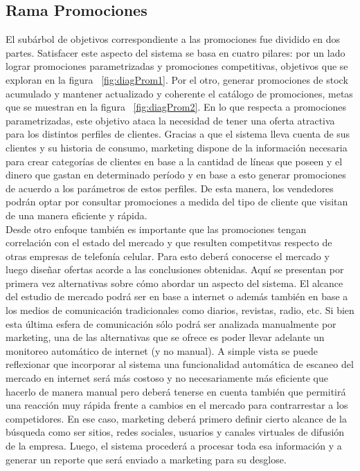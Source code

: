 \subsection{Rama Promociones}

El subárbol de objetivos correspondiente a las promociones fue dividido en dos partes. Satisfacer este aspecto del sistema se basa en cuatro pilares: por un lado lograr promociones parametrizadas y promociones competitivas, objetivos que se exploran en la figura ~\ref{fig:diagProm1}. Por el otro, generar promociones de stock acumulado y mantener actualizado y coherente el catálogo de promociones, metas que se muestran en la figura ~\ref{fig:diagProm2}. En lo que respecta a promociones parametrizadas, este objetivo ataca la necesidad de tener una oferta atractiva para los distintos perfiles de clientes. Gracias a que el sistema lleva cuenta de sus clientes y su historia de consumo, marketing dispone de la información necesaria para crear categorías de clientes en base a la cantidad de líneas que poseen y el dinero que gastan en determinado período y en base a esto generar promociones de acuerdo a los parámetros de estos perfiles. De esta manera, los vendedores podrán optar por consultar promociones a medida del tipo de cliente que visitan de una manera eficiente y rápida.\\
\indent Desde otro enfoque también es importante que las promociones tengan correlación con el estado del mercado y que resulten competitvas respecto de otras empresas de telefonía celular. Para esto deberá conocerse el mercado y luego diseñar ofertas acorde a las conclusiones obtenidas. Aquí se presentan por primera vez alternativas sobre cómo abordar un aspecto del sistema. El alcance del estudio de mercado podrá ser en base a internet o además también en base a los medios de comunicación tradicionales como diarios, revistas, radio, etc. Si bien esta última esfera de comunicación sólo podrá ser analizada manualmente por marketing, una de las alternativas que se ofrece es poder llevar adelante un monitoreo automático de internet (y no manual). A simple vista se puede reflexionar que incorporar al sistema una funcionalidad automática de escaneo del mercado en internet será más costoso y no necesariamente más eficiente que hacerlo de manera manual pero deberá tenerse en cuenta también que permitirá una reacción muy rápida frente a cambios en el mercado para contrarrestar a los competidores. En ese caso, marketing deberá primero definir cierto alcance de la búsqueda como ser sitios, redes sociales, usuarios y canales virtuales de difusión de la empresa. Luego, el sistema procederá a procesar toda esa información y a generar un reporte que será enviado a marketing para su desglose.\\
